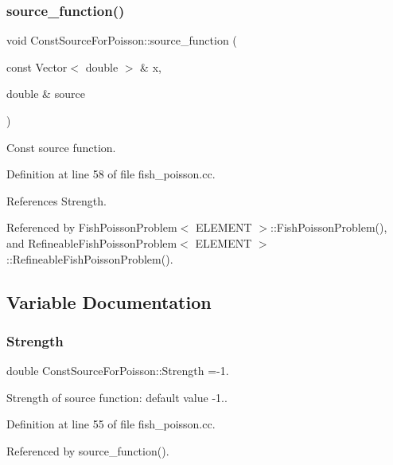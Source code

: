 \subsubsection{\texorpdfstring{source\+\_\+function()}{source\_function()}}
{\footnotesize\ttfamily void Const\+Source\+For\+Poisson\+::source\+\_\+function (\begin{DoxyParamCaption}\item[{const Vector$<$ double $>$ \&}]{x,  }\item[{double \&}]{source }\end{DoxyParamCaption})}



Const source function. 



Definition at line 58 of file fish\+\_\+poisson.\+cc.



References Strength.



Referenced by Fish\+Poisson\+Problem$<$ E\+L\+E\+M\+E\+N\+T $>$\+::\+Fish\+Poisson\+Problem(), and Refineable\+Fish\+Poisson\+Problem$<$ E\+L\+E\+M\+E\+N\+T $>$\+::\+Refineable\+Fish\+Poisson\+Problem().



\subsection{Variable Documentation}
\mbox{\label{namespaceConstSourceForPoisson_add351c5acab2561d68d1fc9ec3d5fc5e}} 
\subsubsection{\texorpdfstring{Strength}{Strength}}
{\footnotesize\ttfamily double Const\+Source\+For\+Poisson\+::\+Strength =-\/1.}



Strength of source function\+: default value -\/1.. 



Definition at line 55 of file fish\+\_\+poisson.\+cc.



Referenced by source\+\_\+function().

